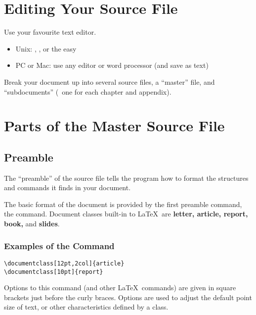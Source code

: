 \section{Editing Your Source File}
Use your favourite text editor.
\begin{itemize}
\item Unix: , , or the easy 
\item PC or Mac: use any editor or word processor (and save as text)
\end{itemize}
Break your document up into several source files, a ``master'' file, and ``subdocuments'' (\eg\ one for each chapter and appendix).
\section{Parts of the Master Source File}
\subsection{Preamble}
The ``preamble'' of the source file tells the  program how to format the structures and commands it finds in your document.

The basic format of the document is provided by the first preamble command, the  command.
Document classes built-in to \LaTeX\ are \textbf{letter, article, report, book,} and \textbf{slides}.
\subsubsection{Examples of the  Command}
\begin{verbatim}
\documentclass[12pt,2col]{article}
\documentclass[10pt]{report}
\end{verbatim}
Options to this command (and other \LaTeX\ commands) are given in square brackets just before the curly braces.
Options are used to adjust the default point size of text, or other characteristics defined by a class.


